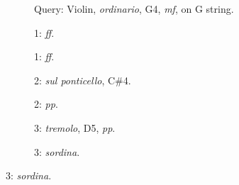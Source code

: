 \begin{figure}
        \newcommand{\scalwidth}{28.0mm}
        \newcommand{\scalheight}{22.1mm}
        \newcommand{\arrowextra}{2mm}

        \begin{subfigure}{\linewidth}
                \centering
                \caption*{Query: Violin, \emph{ordinario}, G4, \emph{mf}, on G string.}
                \label{fig:Vn-ord-G4-mf-4c}
        \end{subfigure}%

        \begin{subfigure}{0.20\textwidth}
                \centering
                \caption*{1: \emph{ff}.}
                \label{fig:Vn-ord-G4-ff-4c}
        \end{subfigure}%
        \begin{subfigure}{0.20\textwidth}
                \centering
                \caption*{1: \emph{ff}.}
                \label{fig:Vn-ord-G4-ff-4c-bis}
        \end{subfigure}%

        \begin{subfigure}{0.20\textwidth}
                \centering
                \caption*{2: \emph{sul ponticello}, C\#4.}
                \label{fig:Vn-pont-Csh4-mf-4c}
        \end{subfigure}%
        \begin{subfigure}{0.20\textwidth}
                \centering
                \caption*{2: \emph{pp}.}
                \label{fig:Vn-ord-G4-pp-4c}
        \end{subfigure}%

        \begin{subfigure}{0.20\textwidth}
                \centering
                \caption*{3: \emph{tremolo}, D5, \emph{pp}.}
                \label{fig:Vn-trem-D5-pp-4c}
        \end{subfigure}%
        \begin{subfigure}{0.20\textwidth}
                \centering
                \caption*{3: \emph{sordina}.}
                \label{fig:Vn+S-ord-G4-mf-4c}
        \end{subfigure}%


\end{figure}
